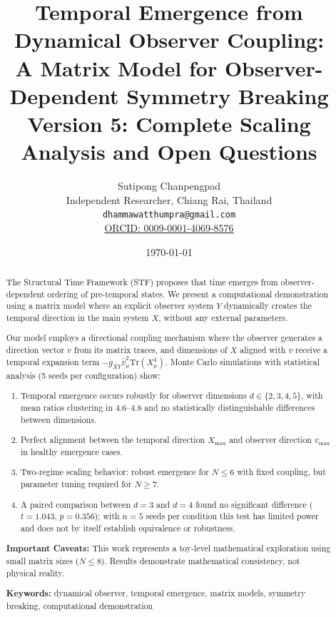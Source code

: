 \documentclass[12pt,a4paper]{article}
\title{\textbf{Temporal Emergence from Dynamical Observer Coupling:\\
       A Matrix Model for Observer-Dependent Symmetry Breaking}\\[0.5cm]
       \large Version 5: Complete Scaling Analysis and Open Questions}
\author{Sutipong Chanpengpad\\
\small Independent Researcher, Chiang Rai, Thailand\\
\small \texttt{dhammawatthumpra@gmail.com}\\
\small \href{https://orcid.org/0009-0001-4069-8576}{ORCID: 0009-0001-4069-8576}}
\date{\today}
\begin{document}
\maketitle

\begin{abstract}
The Structural Time Framework (STF) proposes that time emerges from 
observer-dependent ordering of pre-temporal states. We present a 
computational demonstration using a matrix model where an explicit 
observer system $Y$ dynamically creates the temporal direction in 
the main system $X$, without any external parameters.

Our model employs a directional coupling mechanism where the observer 
generates a direction vector $v$ from its matrix traces, and dimensions 
of $X$ aligned with $v$ receive a temporal expansion term 
$-g_{XY} \hat{v}_\mu^2 \text{Tr}(X_\mu^4)$. Monte Carlo simulations with statistical analysis 
(5 seeds per configuration) show:

\begin{enumerate}[leftmargin=*]
\item Temporal emergence occurs robustly for observer dimensions
      $d \in \{2,3,4,5\}$, with mean ratios clustering in $4.6$--$4.8$ and
      no statistically distinguishable differences between dimensions.
\item Perfect alignment between the temporal direction $X_{\max}$ and 
      observer direction $v_{\max}$ in healthy emergence cases.
\item Two-regime scaling behavior: robust emergence for $N \leq 6$ with 
      fixed coupling, but parameter tuning required for $N \geq 7$.
\item A paired comparison between $d=3$ and $d=4$ found no significant
      difference ($t=1.043$, $p=0.356$); with $n=5$ seeds per condition
      this test has limited power and does not by itself establish
      equivalence or robustness.
\end{enumerate}

\textbf{Important Caveats:} This work represents a toy-level 
mathematical exploration using small matrix sizes ($N \leq 8$). 
Results demonstrate mathematical consistency, not physical reality.

\medskip
\noindent\textbf{Keywords:} dynamical observer, temporal emergence, 
matrix models, symmetry breaking, computational demonstration
\end{abstract}

\tableofcontents
\newpage
\end{document}
